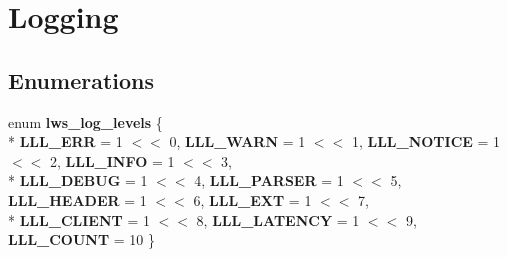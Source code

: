\hypertarget{group__log}{}\section{Logging}
\label{group__log}
\subsection*{Enumerations}
\begin{DoxyCompactItemize}
\item 
enum {\bfseries lws\+\_\+log\+\_\+levels} \{ \\*
{\bfseries L\+L\+L\+\_\+\+E\+RR} = 1 $<$$<$ 0, 
{\bfseries L\+L\+L\+\_\+\+W\+A\+RN} = 1 $<$$<$ 1, 
{\bfseries L\+L\+L\+\_\+\+N\+O\+T\+I\+CE} = 1 $<$$<$ 2, 
{\bfseries L\+L\+L\+\_\+\+I\+N\+FO} = 1 $<$$<$ 3, 
\\*
{\bfseries L\+L\+L\+\_\+\+D\+E\+B\+UG} = 1 $<$$<$ 4, 
{\bfseries L\+L\+L\+\_\+\+P\+A\+R\+S\+ER} = 1 $<$$<$ 5, 
{\bfseries L\+L\+L\+\_\+\+H\+E\+A\+D\+ER} = 1 $<$$<$ 6, 
{\bfseries L\+L\+L\+\_\+\+E\+XT} = 1 $<$$<$ 7, 
\\*
{\bfseries L\+L\+L\+\_\+\+C\+L\+I\+E\+NT} = 1 $<$$<$ 8, 
{\bfseries L\+L\+L\+\_\+\+L\+A\+T\+E\+N\+CY} = 1 $<$$<$ 9, 
{\bfseries L\+L\+L\+\_\+\+C\+O\+U\+NT} = 10
 \}\hypertarget{group__log_ga14542b84d2c76efa7814124bb10f9c5f}{}\label{group__log_ga14542b84d2c76efa7814124bb10f9c5f}

\end{DoxyCompactItemize}

